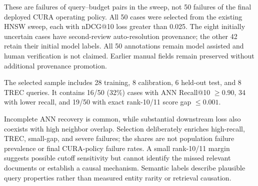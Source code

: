 \documentclass[10pt,twocolumn]{article}
\begin{document}
These are failures of query--budget pairs in the sweep, not 50 failures of the final deployed CURA operating policy. All 50 cases were selected from the existing HNSW sweep, each with nDCG@10 loss greater than 0.025. The eight initially uncertain cases have second-review auto-resolution provenance; the other 42 retain their initial model labels. All 50 annotations remain model assisted and human verification is not claimed. Earlier manual fields remain preserved without additional provenance promotion.

The selected sample includes 28 training, 8 calibration, 6 held-out test, and 8 TREC queries. It contains 16/50 (32\%) cases with ANN Recall@10 $\geq0.90$, 34 with lower recall, and 19/50 with exact rank-10/11 score gap $\leq0.001$.

\begin{table}[!t]
\centering
\caption{Primary labels for 50 selected actual budget-sweep failures. All labels are model assisted; eight initially uncertain cases received automatic second review.}
\label{tab:actual_budget_failure_taxonomy}
\end{table}

Incomplete ANN recovery is common, while substantial downstream loss also coexists with high neighbor overlap. Selection deliberately enriches high-recall, TREC, small-gap, and severe failures; the shares are not population failure prevalence or final CURA-policy failure rates. A small rank-10/11 margin suggests possible cutoff sensitivity but cannot identify the missed relevant documents or establish a causal mechanism. Semantic labels describe plausible query properties rather than measured entity rarity or retrieval causation.
\end{document}
